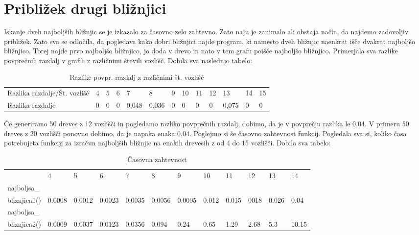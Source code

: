 \documentclass[a4paper,10pt]{article}
\begin{document}
\section{Približek drugi bližnjici}
Iskanje dveh najboljših bližnjic se je izkazalo za časovno zelo zahtevno. Zato naju je zanimalo ali obstaja način, da najdemo zadovoljiv približek. Zato sva se odločila, da pogledava kako dobri bližnjici najde program, ki namesto dveh bližnjic naenkrat išče dvakrat najboljšo bližnjico. Torej najde prvo najboljšo bližnjico, jo doda v drevo in nato v tem grafu poišče najboljšo bližnjico. Primerjala sva razlike povprečnih razdalj v grafih z različnimi števili vozlišč. Dobila sva naslednjo tabelo: \newline
\begin{table}[H]
\centering
\caption{Razlike povpr. razdalj z različnimi št. vozlišč}
\label{my-label}
\begin{tabular}{lllllllllllll}
Razlika razdalje/Št. vozlišč & 4 & 5 & 6 & 7     & 8     & 9 & 10 & 11 & 12 & 13    & 14 & 15 \\
Razlika razdalje             & 0 & 0 & 0 & 0,048 & 0,036 & 0 & 0  & 0  & 0  & 0,075 & 0  & 0 
\end{tabular}
\end{table}

Če generiramo 50 dreves z 12 vozlišči in pogledamo razliko povprečnih razdalj, dobimo, da je v povprečju razlika le 0,04. V primeru 50 dreves z 20 vozlišči ponovno dobimo, da je napaka enaka 0,04. \newline
Poglejmo si še časovno zahtevnost funkcij. Pogledala sva si, koliko časa potrebujeta funkciji za izračun najboljših bližnjic na enakih drevesih z od 4 do 15 vozlišči. Dobila sva tabelo: 
\begin{table}[H]

\caption{Časovna zahtevnost}
\label{my-label}
\begin{tabular}{@{\hspace{-2cm}}llllllllllll}
                        & 4      & 5      & 6      & 7      & 8      & 9      & 10    & 11    & 12   & 13    & 14    \\ 
najboljsa\_\\
bliznjica1() & 0.0008 & 0.0012 & 0.0023 & 0.0035 & 0.0056 & 0.0095 & 0.012 & 0.015 & 0018 & 0.026 & 0.04  \\ 
najboljsa\_\\
bliznjica2() & 0.0009 & 0.0037 & 0.0123 & 0.0356 & 0.094  & 0.24   & 0.65  & 1.29  & 2.68 & 5.3   & 10.15 \\ 
\end{tabular}
\end{table}
\end{document}
